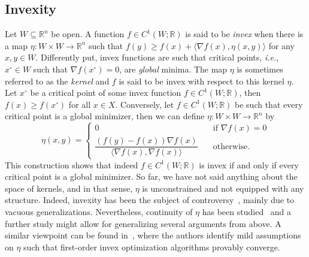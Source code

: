 \documentclass[letterpaper, 10 pt, conference]{ieeeconf}  %
\theoremstyle{mystyle}
\begin{document}
{
\subsection{Invexity}
Let $W\subseteq \mathbb{R}^n$ be open. A function $f\in C^1(W;\mathbb{R})$ is said to be {\textit{invex}} when there is a map $\eta:W\times W\to \mathbb{R}^n$ such that $f(y)\geq f(x)+\langle \nabla f(x),\eta(x,y)\rangle$ for any $x,y\in W$. Differently put, invex functions are such that critical points, \textit{i.e.}, $x^{\circ}\in W$ such that $\nabla f(x^{\circ})=0$, are \textit{global} minima. The map $\eta$ is sometimes referred to as the \textit{kernel} and $f$ is said to be invex with respect to this kernel $\eta$. Let $x^{\circ}$ be a critical point of some invex function $f\in C^1(W;\mathbb{R})$, then $f(x)\geq f(x^{\circ})$ for all $x\in X$. Conversely, let $f\in C^1(W;\mathbb{R})$ be such that every critical point is a global minimizer, then we can define $\eta:W\times W\to \mathbb{R}^n$ by
\begin{equation*}
\label{equ:eta:1}
    \eta(x,y) = \begin{cases}
0 \quad &\text{if } \nabla f(x)=0\\
\dfrac{(f(y)-f(x))\nabla f(x)}{\langle \nabla f(x),\nabla f(x) \rangle}\quad &\text{otherwise}.
    \end{cases}
\end{equation*}
This construction shows that indeed $f\in C^1(W;\mathbb{R})$ is invex if and only if every critical point is a global minimizer. So far, we have not said anything about the space of kernels, and in that sense, $\eta$ is unconstrained and not equipped with any structure. Indeed, invexity has been the subject of controversy~\cite{ref:zualinescu2014critical,ref:borwein2017generalisations}, mainly due to vacuous generalizations. Nevertheless, continuity of $\eta$ has been studied~\cite{ref:smart1996continuity} and a further study might allow for generalizing several arguments from above. A similar viewpoint can be found in~\cite{barik2023invex}, where the authors identify mild assumptions on $\eta$ such that first-order invex optimization algorithms provably converge. 
}
\end{document}
